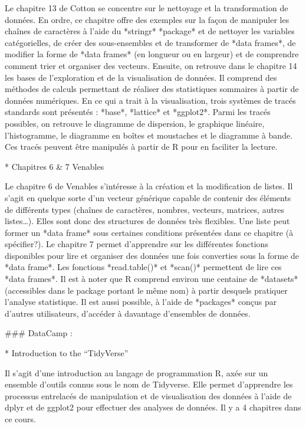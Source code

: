 \documentclass[
  letterpaper,
]{scrbook}
\begin{document}
Le chapitre 13 de Cotton se concentre sur le nettoyage et la
transformation de données. En ordre, ce chapitre offre des exemples sur
la façon de manipuler les chaînes de caractères à l'aide du *stringr*
*package* et de nettoyer les variables catégorielles, de créer des
sous-ensembles et de transformer de *data frames*, de modifier la forme
de *data frames* (en longueur ou en largeur) et de comprendre comment
trier et organiser des vecteurs. Ensuite, on retrouve dans le chapitre
14 les bases de l'exploration et de la visualisation de données. Il
comprend des méthodes de calculs permettant de réaliser des statistiques
sommaires à partir de données numériques. En ce qui a trait à la
visualisation, trois systèmes de tracés standards sont présentés :
*base*, *lattice* et *ggplot2*. Parmi les tracés possibles, on retrouve
le diagramme de dispersion, le graphique linéaire, l'histogramme, le
diagramme en boîtes et moustaches et le diagramme à bande. Ces tracés
peuvent être manipulés à partir de R pour en faciliter la lecture.

* Chapitres 6 \& 7 Venables

Le chapitre 6 de Venables s'intéresse à la création et la modification
de listes. Il s'agit en quelque sorte d'un vecteur générique capable de
contenir des éléments de différents types (chaînes de caractères,
nombres, vecteurs, matrices, autres listes\ldots). Elles sont donc des
structures de données très flexibles. Une liste peut former un *data
frame* sous certaines conditions présentées dans ce chapitre (à
spécifier?). Le chapitre 7 permet d'apprendre sur les différentes
fonctions disponibles pour lire et organiser des données une fois
converties sous la forme de *data frame*. Les fonctions *read.table()*
et *scan()* permettent de lire ces *data frames*. Il est à noter que R
comprend environ une centaine de *datasets* (accessibles dans le package
portant le même nom) à partir desquels pratiquer l'analyse statistique.
Il est aussi possible, à l'aide de *packages* conçus par d'autres
utilisateurs, d'accéder à davantage d'ensembles de données.

\#\#\# DataCamp :

* Introduction to the ``TidyVerse''

Il s'agit d'une introduction au langage de programmation R, axée sur un
ensemble d'outils connus sous le nom de Tidyverse. Elle permet
d'apprendre les processus entrelacés de manipulation et de visualisation
des données à l'aide de dplyr et de ggplot2 pour effectuer des analyses
de données. Il y a 4 chapitres dans ce cours.
\end{document}
